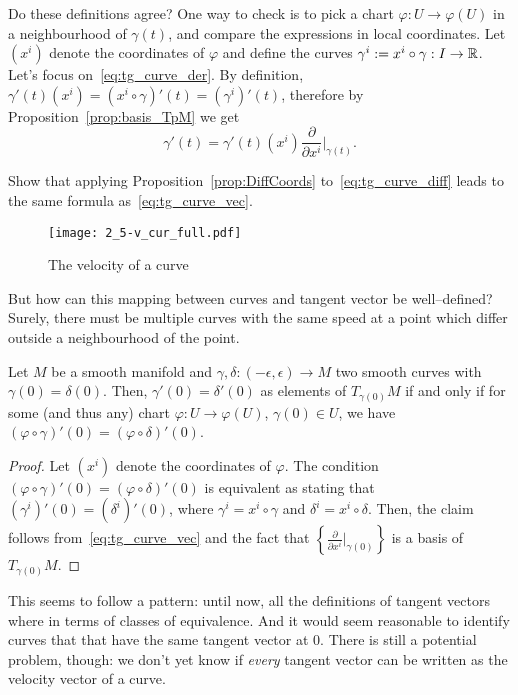 Do these definitions agree?
One way to check is to pick a chart $\varphi: U \to \varphi(U)$ in a neighbourhood of $\gamma(t)$, and compare the expressions in local coordinates. Let $(x^i)$ denote the coordinates of $\varphi$ and define the curves $\gamma^i := x^i \circ \gamma : I\to\mathbb{R}$.
Let's focus on~\eqref{eq:tg_curve_der}. By definition, $\gamma'(t)(x^i) = (x^i\circ\gamma)'(t) = (\gamma^i)'(t)$, therefore by Proposition~\ref{prop:basis_TpM} we get
\begin{equation}\label{eq:tg_curve_vec}
  \gamma'(t) = %
  \gamma'(t)(x^i) \frac{\partial}{\partial x^i}\Big|_{\gamma(t)}.
\end{equation}
\begin{exercise}
  Show that applying Proposition~\ref{prop:DiffCoords} to~\eqref{eq:tg_curve_diff} leads to the same formula as~\eqref{eq:tg_curve_vec}.
\end{exercise}

\begin{figure*}[htp]
  \centering
  \texttt{[image: 2\_5-v\_cur\_full.pdf]}
  \caption{The velocity of a curve}
  \label{fig:2_5-v_cur_full}
\end{figure*}

But how can this mapping between curves and tangent vector be well--defined?
Surely, there must be multiple curves with the same speed at a point which differ outside a neighbourhood of the point.

\begin{lemma}\label{lem:equiv_tg_curves}
  Let $M$ be a smooth manifold and $\gamma, \delta : (-\epsilon, \epsilon) \to M$ two smooth curves with $\gamma(0) = \delta(0)$. Then, $\gamma'(0) = \delta'(0)$ as elements of $T_{\gamma(0)}M$ if and only if for some (and thus any) chart $\varphi:U\to\varphi(U)$, $\gamma(0)\in U$, we have $(\varphi\circ \gamma)'(0) = (\varphi\circ\delta)'(0)$.
\end{lemma}
\begin{proof}
  Let $(x^i)$ denote the coordinates of $\varphi$. The condition $(\varphi\circ \gamma)'(0) = (\varphi\circ\delta)'(0)$ is equivalent as stating that $(\gamma^i)'(0) = (\delta^i)'(0)$, where $\gamma^i = x^i\circ\gamma$ and $\delta^i=x^i\circ\delta$. Then, the claim follows from~\eqref{eq:tg_curve_vec} and the fact that $\left\{\frac{\partial}{\partial x^i}\big|_{\gamma(0)}\right\}$ is a basis of $T_{\gamma(0)}M$.
\end{proof}

This seems to follow a pattern: until now, all the definitions of tangent vectors where in terms of classes of equivalence.
And it would seem reasonable to identify curves that that have the same tangent vector at $0$.
There is still a potential problem, though: we don't yet know if \emph{every} tangent vector can be written as the velocity vector of a curve.

